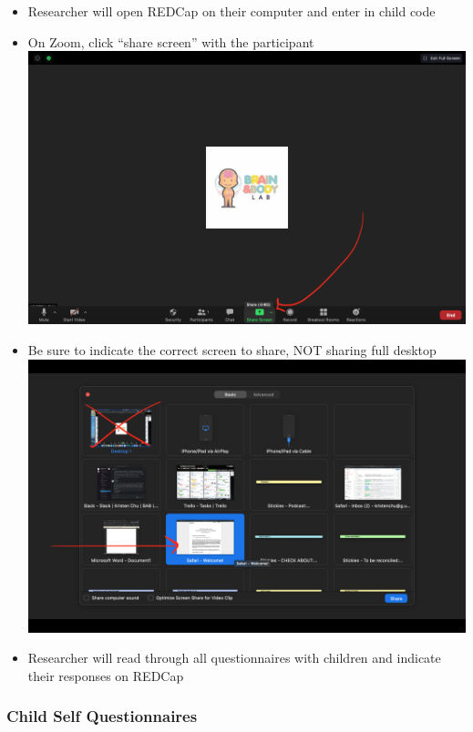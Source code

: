 \documentclass[]{book}
\providecommand{\tightlist}{%
  \setlength{\itemsep}{0pt}\setlength{\parskip}{0pt}}
\begin{document}
\begin{itemize}
\tightlist
\item
  Researcher will open REDCap on their computer and enter in child code
\item
  On Zoom, click ``share screen'' with the participant \includegraphics{images/zoom_screenshare/1.png}
\item
  Be sure to indicate the correct screen to share, NOT sharing full desktop \includegraphics{images/zoom_screenshare/2.png}
\item
  Researcher will read through all questionnaires with children and indicate their responses on REDCap
\end{itemize}

\hypertarget{child-self-questionnaires}{%
\subsubsection{Child Self Questionnaires}\label{child-self-questionnaires}}
\end{document}
